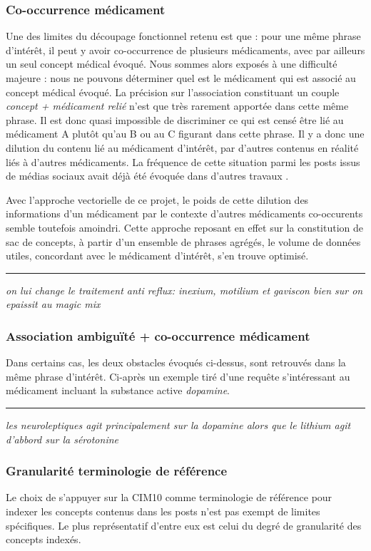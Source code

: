 \documentclass[a4paper, 12pt, openany, oneside, abstract=on]{article} %
\begin{document}
\subsubsection{Co-occurrence médicament}
\label{cooccurr}
Une des limites du découpage fonctionnel retenu est que : pour une même phrase d'intérêt, il peut y avoir co-occurrence de plusieurs médicaments, avec par ailleurs un seul concept médical évoqué. Nous sommes alors exposés à une difficulté majeure : nous ne pouvons déterminer quel est le médicament qui est associé au concept médical évoqué. La précision sur l'association constituant un couple \emph{concept + médicament relié} n'est que très rarement apportée dans cette même phrase. Il est donc quasi impossible de discriminer ce qui est censé être lié au médicament A plutôt qu'au B ou au C figurant dans cette phrase. Il y a donc une dilution du contenu lié au médicament d'intérêt, par d'autres contenus en réalité liés à d'autres médicaments. La fréquence de cette situation parmi les posts issus de médias sociaux avait déjà été évoquée dans d'autres travaux \cite{Kalyanam2017}.

Avec l'approche vectorielle de ce projet, le poids de cette dilution des informations d'un médicament par le contexte d'autres médicaments co-occurents semble toutefois amoindri. Cette approche reposant en effet sur la constitution de sac de concepts, à partir d'un ensemble de phrases agrégés, le volume de données utiles, concordant avec le médicament d'intérêt, s'en trouve optimisé.
\begin{center}\quad\rule{5in}{0.8pt}\end{center}
\emph{\og{}on lui change le traitement anti reflux: inexium, motilium et gaviscon bien sur on epaissit au magic mix\fg{}}

\subsubsection{Association ambiguïté + co-occurrence médicament}
Dans certains cas, les deux obstacles évoqués ci-dessus, sont retrouvés dans la même phrase d'intérêt. Ci-après un exemple tiré d'une requête s'intéressant au médicament incluant la substance active \emph{dopamine}.
\begin{center}\quad\rule{5in}{0.8pt}\end{center}
\emph{\og{}les neuroleptiques agit principalement sur la dopamine alors que le lithium agit d'abbord sur la sérotonine\fg{}}

\subsubsection{Granularité terminologie de référence}
Le choix de s'appuyer sur la CIM10 comme terminologie de référence pour indexer les concepts contenus dans les posts n'est pas exempt de limites spécifiques. Le plus représentatif d'entre eux est celui du degré de granularité des concepts indexés.
\end{document}
